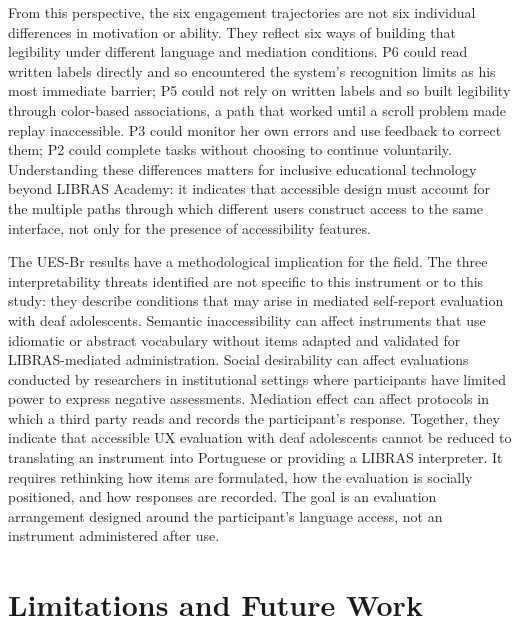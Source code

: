 \documentclass{llncs}
\begin{document}
From this perspective, the six engagement trajectories are not six individual differences
in motivation or ability. They reflect six ways of building that legibility under
different language and mediation conditions. P6 could read written labels
directly and so encountered the system's recognition limits as his most immediate barrier;
P5 could not rely on written labels and so built legibility through color-based
associations, a path that worked until a scroll problem made replay inaccessible.
P3 could monitor her own errors and use feedback to correct them; P2 could complete
tasks without choosing to continue voluntarily. Understanding these differences
matters for inclusive educational technology beyond LIBRAS Academy: it indicates that
accessible design must account for the multiple paths through which different users
construct access to the same interface, not only for the presence of accessibility
features.

The UES-Br results have a methodological implication for the field. The three
interpretability threats identified are not specific to this instrument or to this
study: they describe conditions that may arise in mediated self-report evaluation
with deaf adolescents. Semantic inaccessibility can affect instruments that use
idiomatic or abstract vocabulary without items adapted and validated for LIBRAS-mediated
administration. Social desirability can affect evaluations conducted by researchers in
institutional settings where participants have limited power to express negative
assessments. Mediation effect can affect protocols in which a third party reads and
records the participant's response.
Together, they indicate that accessible UX evaluation with deaf adolescents cannot be
reduced to translating an instrument into Portuguese or providing a LIBRAS interpreter.
It requires rethinking how items are formulated, how the evaluation is socially positioned, and how responses are recorded. The goal is an evaluation arrangement designed around the participant's language access, not an instrument administered after use.

\section{Limitations and Future Work}
\end{document}
